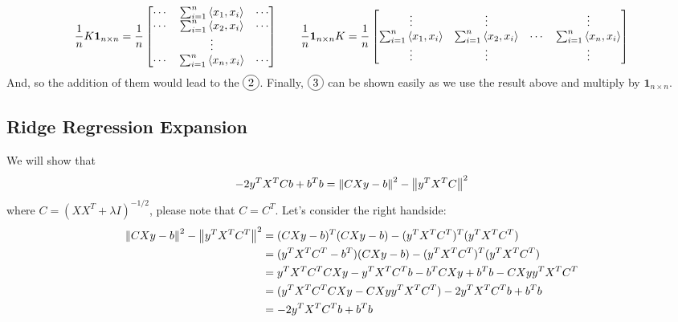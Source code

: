 \begin{equation*}
\begin{aligned}
    \frac{1}{n}K\boldsymbol{1}_{n\times n} = \frac{1}{n}\begin{bmatrix}
        \cdots & \sum^n_{i=1}\left\langle x_1, x_i \right\rangle & \cdots \\
        \cdots & \sum^n_{i=1}\left\langle x_2, x_i \right\rangle & \cdots \\
        & \vdots & \\
        \cdots & \sum^n_{i=1}\left\langle x_n, x_i \right\rangle & \cdots \\
    \end{bmatrix} \qquad \frac{1}{n}\boldsymbol{1}_{n\times n}K = \frac{1}{n}\begin{bmatrix}
        \vdots & \vdots & & \vdots \\
        \sum^n_{i=1}\left\langle x_1, x_i \right\rangle & \sum^n_{i=1}\left\langle x_2, x_i \right\rangle & \cdots & \sum^n_{i=1}\left\langle x_n, x_i \right\rangle \\
        \vdots & \vdots & & \vdots \\
    \end{bmatrix}
\end{aligned} 
\end{equation*}
And, so the addition of them would lead to the $\circled{2}$. Finally, $\circled{3}$ can be shown easily as we use the result above and multiply by $\boldsymbol 1_{n\times n}$.

\subsection{Ridge Regression Expansion}
\label{appendix:ridge-regression}
We will show that 
\begin{equation*}
    - 2y^TX^TCb + b^Tb = \left\lVert CXy-b\right\rVert^2 - \left\lVert y^TX^TC\right\rVert^2
\end{equation*}
where $C=(XX^T+\lambda I)^{-1/2}$, please note that $C = C^T$. Let's consider the right handside:
\begin{equation*}
\begin{aligned}
    \left\lVert CXy-b\right\rVert^2 - \left\lVert y^TX^TC^T\right\rVert^2 &= (CXy-b)^T(CXy-b) - (y^TX^TC^T)^T(y^TX^TC^T) \\
    &= (y^TX^TC^T - b^T)(CXy-b) - (y^TX^TC^T)^T(y^TX^TC^T) \\
    &= y^TX^TC^TCXy - y^TX^TC^Tb - b^TCXy + b^Tb - CXyy^TX^TC^T \\
    &= (y^TX^TC^TCXy - CXyy^TX^TC^T) - 2y^TX^TC^Tb + b^Tb \\
    &= - 2y^TX^TC^Tb + b^Tb \\
\end{aligned}
\end{equation*}

